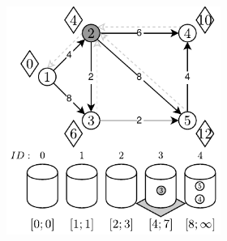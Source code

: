 \begin{figure}[!ht]
\begin{subfigure}[b]{\textwidth}
\begin{subfigure}[b]{0.32\textwidth}
			\caption{}
			\label{fig:exampleRadixHeapC:b}
		\end{subfigure}
		\hfill
		\begin{subfigure}[b]{0.32\textwidth}
			\includegraphics[width=\textwidth]{Chapter_II/RADIX-HEAP-C-Example/c.pdf}
			\caption{}
			\label{fig:exampleRadixHeapC:c}
		\end{subfigure}
		\hfill\null
	\end{subfigure}
	\begin{subfigure}[b]{\textwidth}
		\null\hfill
		\begin{subfigure}[b]{0.32\textwidth}

\end{subfigure}
\end{subfigure}
\end{figure}
